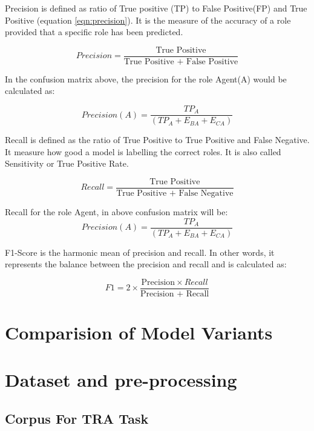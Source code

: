 Precision is defined as ratio of True positive (TP) to False Positive(FP) and True Positive (equation \ref{eqn:precision}). It is the measure of the accuracy of a role provided that a specific role has been predicted. 

\begin{equation}\label{eqn:precision}
Precision= \frac{\text{True Positive}}{\text{True Positive + False Positive}}
\end{equation}

In the confusion matrix above, the precision for the role Agent(A) would be calculated as:

\[Precision(A) = \frac{TP_{A}}{(TP_{A}+E_{BA}+E_{CA})}\]

Recall is defined as the ratio of True Positive to True Positive and False Negative. It measure how good a model is labelling the correct roles. It is also called Sensitivity or True Positive Rate.

\begin{equation}\label{eqn:precision}
Recall= \frac{\text{True Positive}}{\text{True Positive + False Negative}}
\end{equation}

Recall for the role Agent, in above confusion matrix will be:
\[Precision(A) = \frac{TP_{A}}{(TP_{A}+E_{BA}+E_{CA})}\]

F1-Score is the harmonic mean of precision and recall. In other words, it represents the balance between the precision and recall and is calculated as:

\begin{equation}\label{eqn:precision}
F1= 2\times \frac{\text{Precision} \times{Recall }}{\text{Precision + Recall}}
\end{equation}

\section{Comparision of Model Variants}




\section{Dataset and pre-processing}

\subsection{Corpus For TRA Task}


